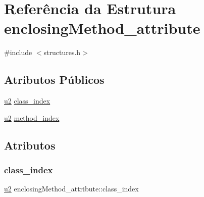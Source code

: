 \hypertarget{structenclosingMethod__attribute}{}\section{Referência da Estrutura enclosing\+Method\+\_\+attribute}
\label{structenclosingMethod__attribute}


{\ttfamily \#include $<$structures.\+h$>$}

\subsection*{Atributos Públicos}
\begin{DoxyCompactItemize}
\item 
\hyperlink{lista__operandos_8h_a732cde1300aafb73b0ea6c2558a7a54f}{u2} \hyperlink{structenclosingMethod__attribute_a3f2ebf2e90b6eb973e3fc92d88307c06}{class\+\_\+index}
\item 
\hyperlink{lista__operandos_8h_a732cde1300aafb73b0ea6c2558a7a54f}{u2} \hyperlink{structenclosingMethod__attribute_a86276273eb87b21a7d0bb23daddb0bca}{method\+\_\+index}
\end{DoxyCompactItemize}


\subsection{Atributos}
\mbox{\label{structenclosingMethod__attribute_a3f2ebf2e90b6eb973e3fc92d88307c06}} 
\subsubsection{\texorpdfstring{class\+\_\+index}{class\_index}}
{\footnotesize\ttfamily \hyperlink{lista__operandos_8h_a732cde1300aafb73b0ea6c2558a7a54f}{u2} enclosing\+Method\+\_\+attribute\+::class\+\_\+index}

\mbox{\label{structenclosingMethod__attribute_a86276273eb87b21a7d0bb23daddb0bca}} 
